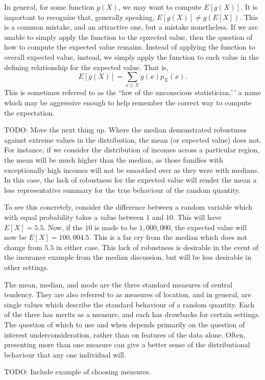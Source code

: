 \documentclass[
  letterpaper,
  DIV=11,
  numbers=noendperiod]{scrreprt}
\begin{document}
In general, for some function \(g(X)\), we may want to compute
\(E[g(X)]\). It is important to recognize that, generally speaking,
\(E[g(X)] \neq g(E[X])\). This is a common mistake, and an attractive
one, but a mistake nonetheless. If we are unable to simply apply the
function to the epxected value, then the question of how to compute the
expected value remains. Instead of applying the function to overall
expected value, instead, we simply apply the function to each value in
the defining relationship for the expected value. That is,
\[E[g(X)] = \sum_{x\in\mathcal{X}} g(x)p_X(x).\] This is sometimes
referred to as the ``law of the unconscious statistician,'\,' a name
which may be aggressive enough to help remember the correct way to
compute the expectation.

TODO: Move the next thing up. Where the median demonstrated robustness
against extreme values in the distribution, the mean (or expected value)
does not. For instance, if we consider the distribution of incomes
across a particular region, the mean will be much higher than the
median, as those families with exceptionally high incomes will not be
smoothed over as they were with medians. In this case, the lack of
robustness for the expected value will render the mean a less
representative summary for the true behaviour of the random quantity.

To see this concretely, consider the difference between a random
variable which with equal probability takes a value between \(1\) and
\(10\). This will have \(E[X] = 5.5\). Now, if the \(10\) is made to be
\(1,000,000\), the expected value will now be \(E[X] = 100,004.5\). This
is a far cry from the median which does not change from \(5.5\) in
either case. This lack of robustness is desirable in the event of the
insurance example from the median discussion, but will be less desirable
in other settings.

The mean, median, and mode are the three standard measures of central
tendency. They are also referred to as measures of location, and in
general, are single values which describe the standard behaviour of a
random quantity. Each of the three has merits as a measure, and each has
drawbacks for certain settings. The question of which to use and when
depends primarily on the question of interest underconsideration, rather
than on features of the data alone. Often, presenting more than one
measure can give a better sense of the distributional behaviour that any
one individual will.

TODO: Include example of choosing measures.
\end{document}
